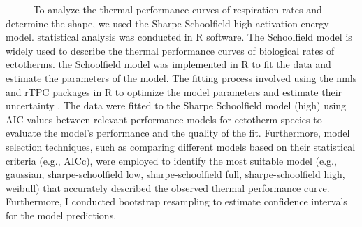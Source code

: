 \documentclass[
]{article}
\begin{document}
~~~~~ To analyze the thermal performance curves of respiration rates and
determine the shape, we used the Sharpe Schoolfield high activation
energy model. statistical analysis was conducted in R software. The
Schoolfield model is widely used to describe the thermal performance
curves of biological rates of ectotherms. the Schoolfield model was
implemented in R to fit the data and estimate the parameters of the
model. The fitting process involved using the nmls and rTPC packages in
R to optimize the model parameters and estimate their uncertainty
\citep{padfield2021rtpc}. The data were fitted to the Sharpe Schoolfield
model (high) using AIC values between relevant performance models for
ectotherm species to evaluate the model's performance and the quality of
the fit. Furthermore, model selection techniques, such as comparing
different models based on their statistical criteria (e.g., AICc), were
employed to identify the most suitable model (e.g., gaussian,
sharpe-schoolfield low, sharpe-schoolfield full, sharpe-schoolfield
high, weibull) that accurately described the observed thermal
performance curve. Furthermore, I conducted bootstrap resampling to
estimate confidence intervals for the model predictions.
\end{document}
